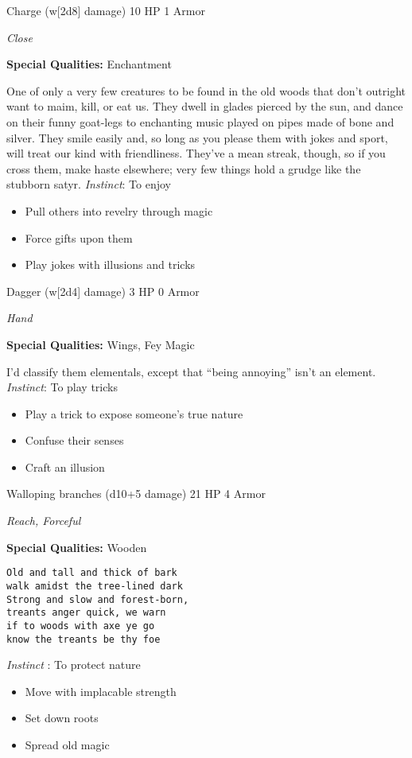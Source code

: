 \HRule
{}

Charge (w[2d8] damage)\hspace*{\fill} 10 HP 1 Armor

\emph{Close}

\textbf{Special Qualities:}
Enchantment

\HRule
One of only a very few creatures to be found in the old woods that don't outright want to maim, kill, or eat us. They dwell in glades pierced by the sun, and dance on their funny goat-legs to enchanting music played on pipes made of bone and silver. They smile easily and, so long as you please them with jokes and sport, will treat our kind with friendliness. They've a mean streak, though, so if you cross them, make haste elsewhere; very few things hold a grudge like the stubborn satyr. \emph{Instinct}: To enjoy
\begin{itemize}
\item Pull others into revelry through magic
\item Force gifts upon them
\item Play jokes with illusions and tricks
\end{itemize}
\newpage
\HRule
{}

Dagger (w[2d4] damage)\hspace*{\fill} 3 HP 0 Armor

\emph{Hand}

\textbf{Special Qualities:}
Wings, Fey Magic

\HRule
I'd classify them elementals, except that ``being annoying'' isn't an element. \emph{Instinct}: To play tricks
\begin{itemize}
\item Play a trick to expose someone's true nature
\item Confuse their senses
\item Craft an illusion
\end{itemize}

\HRule
{}

Walloping branches (d10+5 damage)\hspace*{\fill} 21 HP 4 Armor

\emph{Reach, Forceful}

\textbf{Special Qualities:}
Wooden

\HRule
\begin{verbatim}
Old and tall and thick of bark
walk amidst the tree-lined dark
Strong and slow and forest-born,
treants anger quick, we warn
if to woods with axe ye go
know the treants be thy foe
\end{verbatim}
\emph{Instinct}
: To protect nature
\begin{itemize}
\item Move with implacable strength
\item Set down roots
\item Spread old magic
\end{itemize}
\newpage
\HRule
{}

